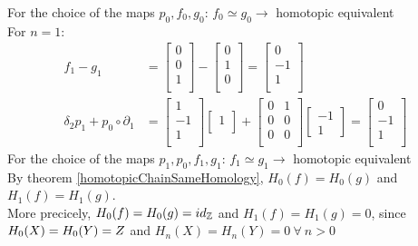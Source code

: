 \documentclass[11pt,a4paper]{report}
\begin{document}
\begin{Ex}
         For the choice of the maps $p_0, f_0, g_0$: $f_0 \simeq g_0 \rightarrow$ homotopic equivalent \\
         For $n = 1$: 
           \begin{align*}
            f_1 - g_1 &= \begin{bmatrix} 0 \\
                            0  \\
                            1 \\  \end{bmatrix} -
            \begin{bmatrix} 0 \\
                            1  \\
                            0 \\ \end{bmatrix} = 
                            \begin{bmatrix}0 \\
                            -1 \\
                            1 \\ \end{bmatrix} \\
           \delta_{2}p_1 + p_0 \circ \partial_1 &= \begin{bmatrix} 1  \\
                            -1 \\
                            1 \\  \end{bmatrix} \begin{bmatrix} 1 \\ \end{bmatrix}
                            + \begin{bmatrix} 0 & 1 \\ 0 & 0 \\ 0 & 0 \\   \end{bmatrix} \begin{bmatrix} -1 \\ 1 \end{bmatrix} 
                            = \begin{bmatrix} 0 \\
                            -1 \\
                            1 \\\end{bmatrix} 
            \end{align*}
             For the choice of the maps $p_1, p_0, f_1, g_1$: $f_1 \simeq g_1 \rightarrow$ homotopic equivalent \\
             By theorem \ref{homotopicChainSameHomology}, $H_0(f) = H_0(g)$ and $H_1(f) = H_1(g)$. \\
             More precicely, $H_0(f) = H_0(g) = id_{\mathbb{Z}}$ and $H_1(f) = H_1(g) = 0$, since
             $H_0(X) = H_0(Y) = \\Z$ and $H_n(X) = H_n(Y) = 0 \ \forall \ n > 0$
        \end{Ex}
\end{document}
